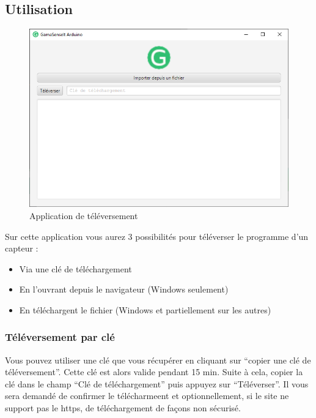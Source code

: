     \subsection{Utilisation}\label{subsec:utilisation}

        \begin{figure}[H]
            \begin{center}
                \includegraphics[width=12cm]{resources/app}
            \end{center}
            \caption{Application de téléversement}\label{fig:app-televersement}
        \end{figure}

        Sur cette application vous aurez 3 possibilités pour téléverser le programme d'un capteur :

        \begin{itemize}
            \item Via une clé de téléchargement
            \item En l'ouvrant depuis le navigateur (Windows seulement)
            \item En téléchargent le fichier (Windows et partiellement sur les autres)
        \end{itemize}

        \subsubsection{Téléversement par clé}

            Vous pouvez utiliser une clé que vous récupérer en cliquant sur ``copier une clé de téléversement''.
            Cette clé est alors valide pendant 15 min.
            Suite à cela, copier la clé dans le champ ``Clé de téléchargement'' puis appuyez sur ``Téléverser''.
            Il vous sera demandé de confirmer le télécharmeent et optionnellement, si le site ne support pas le https,
            de téléchargement de façons non sécurisé.

